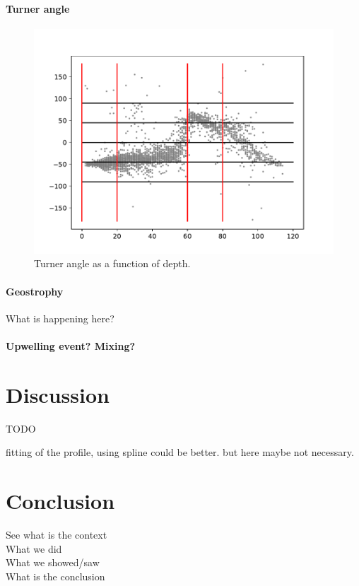 \documentclass[12pt,a4paper]{article}
\begin{document}
\paragraph{Turner angle}
\begin{figure}
  \centering
  \includegraphics{turner}
  \caption{\label{fig:turner}Turner angle as a function of depth.}
\end{figure}

\paragraph{Geostrophy}
What is happening here?

\paragraph{Upwelling event? Mixing?}
\citep{arneborg2003}

\section{Discussion}

TODO

fitting of the profile, using spline could be better. but here maybe not necessary. 

\section{Conclusion}

See what is the context\\
What we did\\
What we showed/saw\\
What is the conclusion
\end{document}
